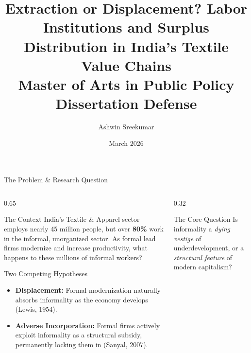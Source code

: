 \documentclass[aspectratio=169, 10pt]{beamer}
\title[Formal-Informal Linkages: Final Defense]{%
  Extraction or Displacement? Labor Institutions and Surplus Distribution in India's Textile Value Chains\\[4pt]
  \small Master of Arts in Public Policy Dissertation Defense}
\author[Ashwin Sreekumar]{Ashwin Sreekumar}
\institute{CHRIST (Deemed to be University)}
\date{March 2026}
\begin{document}
\begin{frame}
\titlepage
\end{frame}

\begin{frame}{The Problem \& Research Question}

\begin{columns}[T]
\begin{column}{0.65\textwidth}
  \begin{block}{The Context}
    India's Textile \& Apparel sector employs nearly 45 million people, but over \textbf{80\%} work in the informal, unorganized sector. As formal lead firms modernize and increase productivity, what happens to these millions of informal workers?
  \end{block}

  \vspace{10pt}
  \begin{alertblock}{Two Competing Hypotheses}
    \begin{itemize}
      \item \textbf{Displacement:} Formal modernization naturally absorbs informality as the economy develops (Lewis, 1954).
      \item \textbf{Adverse Incorporation:} Formal firms actively exploit informality as a structural subsidy, permanently locking them in (Sanyal, 2007).
    \end{itemize}
  \end{alertblock}
\end{column}
\begin{column}{0.32\textwidth}
  \vspace{5pt}
  \begin{exampleblock}{The Core Question}
    \centering
    Is informality a \textit{dying vestige} of underdevelopment, or a \textit{structural feature} of modern capitalism?
  \end{exampleblock}
\end{column}
\end{columns}

\end{frame}
\end{document}
